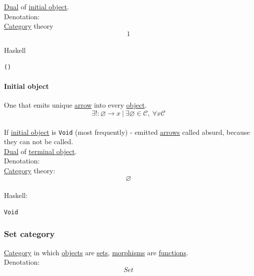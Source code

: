\documentclass[11pt]{article}
\begin{document}
\hyperref[org28cefbe]{Dual} of \hyperref[org775e1a6]{initial object}.\\

Denotation:\\

\hyperref[org0450535]{Category} theory\\
$$ 1 $$\\

Haskell\\
\begin{verbatim}
()
\end{verbatim}

\paragraph{\label{org775e1a6}Initial object}
\label{sec:org30db42e}
One that emits unique \hyperref[org03967f4]{arrow} into every \hyperref[org4be0e9d]{object}.\\

$$ \exists ! : \varnothing \to x \ | \ \exists \varnothing \in \mathcal{C}, \ \forall x \mathcal{C} $$\\

If \hyperref[org775e1a6]{initial object} is \texttt{Void} (most frequently) - emitted \hyperref[org9c45dc6]{arrows} called absurd, because they can not be called.\\

\hyperref[org28cefbe]{Dual} of \hyperref[org84bb7e1]{terminal object}.\\

Denotation:\\

\hyperref[org0450535]{Category} theory:\\
$$ \varnothing $$\\

Haskell:\\
\begin{verbatim}
Void
\end{verbatim}

\subsubsection{\label{orgceb0d4a}Set category}
\label{sec:org669aab7}
\hyperref[org0450535]{Category} in which \hyperref[org363acc2]{objects} are \hyperref[org58ec608]{sets}, \hyperref[org6c2fa5c]{morphisms} are \hyperref[orgaa8fb87]{functions}.\\

Denotation:\\
$$ Set $$\\
\end{document}

